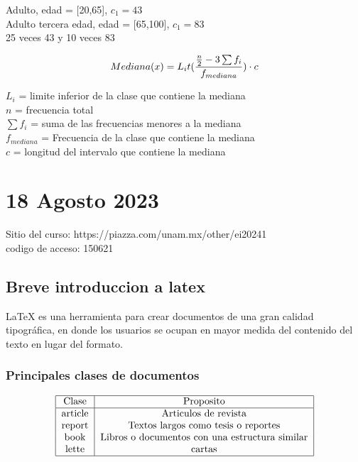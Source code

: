\documentclass{article}
\begin{document}
Adulto, edad = [20,65], $c_1 = 43$ \\
Adulto tercera edad, edad = [65,100], $c_1 = 83$\\

25 veces 43 y 10 veces 83

\[
    Mediana(x) = L_{i} t(\frac{\frac{n}{2} - 3 \sum f_i}{f_{mediana}}) \cdot c \\ \\
\]

\noindent $L_i$ = limite inferior de la clase que contiene la mediana\\
$n$ = frecuencia total \\
$\sum f_i$ = suma de las frecuencias menores a la mediana\\
$f_{mediana}$ = Frecuencia de la clase que contiene la mediana\\
$c$ = longitud del intervalo que contiene la mediana \\

\newpage

\section{18 Agosto 2023}

Sitio del curso: https://piazza.com/unam.mx/other/ei20241 \\
codigo de acceso: 150621

\subsection{Breve introduccion a latex}

LaTeX es una herramienta para crear documentos de una gran
calidad tipográfica, en donde los usuarios se ocupan en mayor
medida del contenido del texto en lugar del formato.

\subsubsection{Principales clases de documentos}

\[
    \begin{tabular}{|c|c|}
        \hline
        Clase   & Proposito                                      \\
        \hline
        article & Articulos de revista                           \\
        report  & Textos largos como tesis o reportes            \\
        book    & Libros o documentos con una estructura similar \\
        lette   & cartas                                         \\
        \hline
    \end{tabular}
\]
\end{document}

